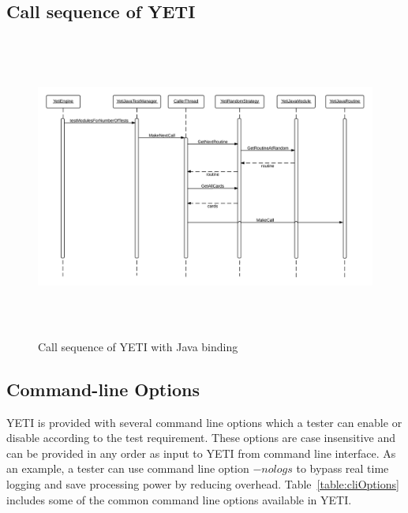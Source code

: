 \subsection{Call sequence of YETI}





\begin{figure}[H]
	\centering
	\includegraphics[width=15cm, height=10cm]{chapter3/sequenceDiagram.png}
	\caption{Call sequence of YETI with Java binding}
	\label{fig:yetiCore}
\end{figure}


\subsection{Command-line Options}
YETI is provided with several command line options which a tester can enable or disable according to the test requirement. These options are case insensitive and can be provided in any order as input to YETI from command line interface. As an example, a tester can use command line option $-nologs$ to bypass real time logging and save processing power by reducing overhead. Table~\ref{table:cliOptions} includes some of the common command line options available in YETI.

